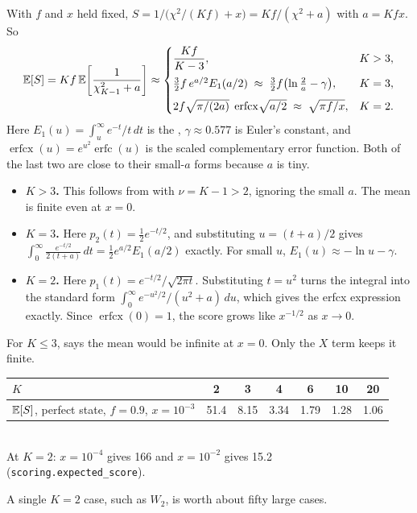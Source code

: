 \documentclass[11pt]{scrartcl}
\newcommand{\file}[1]{\texttt{\small #1}}
\begin{document}
With $f$ and $x$ held fixed, $S=1/\bigl(\chi^2/(Kf)+x\bigr)=Kf/(\chi^2+a)$ with $a=Kfx$. So
\[
  \mathbb E[S]=Kf\,\mathbb E\!\left[\frac{1}{\chi^2_{K-1}+a}\right]\approx
  \begin{cases}
    \dfrac{Kf}{K-3}, & K>3,\\[8pt]
    \tfrac32 f\,e^{a/2}E_1(a/2)\;\approx\;\tfrac32 f\bigl(\ln\tfrac2a-\gamma\bigr), & K=3,\\[6pt]
    2f\sqrt{\pi/(2a)}\;\operatorname{erfcx}\!\sqrt{a/2}\;\approx\;\sqrt{\pi f/x}, & K=2.
  \end{cases}
\]
Here $E_1(u)=\int_u^\infty e^{-t}/t\,dt$ is the , $\gamma\approx0.577$
is Euler's constant, and $\operatorname{erfcx}(u)=e^{u^2}\operatorname{erfc}(u)$ is the scaled
complementary error function. Both of the last two are close to their small-$a$ forms because $a$
is tiny.
\begin{itemize}
  \item \textbf{$K>3$.} This follows from  with $\nu=K-1>2$, ignoring the small $a$.
        The mean is finite even at $x=0$.
  \item \textbf{$K=3$.} Here $p_2(t)=\tfrac12e^{-t/2}$, and substituting $u=(t+a)/2$ gives
        $\int_0^\infty\frac{e^{-t/2}}{2(t+a)}\,dt=\tfrac12e^{a/2}E_1(a/2)$ exactly. For small $u$,
        $E_1(u)\approx-\ln u-\gamma$.
  \item \textbf{$K=2$.} Here $p_1(t)=e^{-t/2}/\sqrt{2\pi t}$. Substituting $t=u^2$ turns the integral
        into the standard form $\int_0^\infty e^{-u^2/2}/(u^2+a)\,du$, which gives the erfcx expression
        exactly. Since $\operatorname{erfcx}(0)=1$, the score grows like $x^{-1/2}$ as $x\to0$.
\end{itemize}
For $K\le3$,  says the mean would be infinite at $x=0$. Only the $X$ term keeps it
finite.

\begin{center}\small
\begin{tabular}{lcccccc}
  \toprule
  $K$ & 2 & 3 & 4 & 6 & 10 & 20\\
  \midrule
  $\mathbb E[S]$, perfect state, $f=0.9$, $x=10^{-3}$ & 51.4 & 8.15 & 3.34 & 1.79 & 1.28 & 1.06\\
  \bottomrule
\end{tabular}\\[2pt]
At $K=2$: $x=10^{-4}$ gives 166 and $x=10^{-2}$ gives 15.2 (\file{scoring.expected\_score}).
\end{center}

A single $K=2$ case, such as $W_2$, is worth about fifty large cases.
\end{document}
